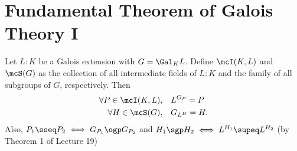 \documentclass[a4paper]{article}
\begin{document}
\section{Fundamental Theorem of Galois Theory I}
\begin{ttheorem}
  Let \( L:K \) be a Galois extension with \( G=\Gal_K L \).
  Define \( \mcI(K,L) \) and \( \mcS(G) \) as the collection of all intermediate fields of \(L:K\) and the family of all subgroups of \( G \), respectively.
  Then \begin{align*}
    \forall P\in \mcI(K,L), \quad &L^{G_P} = P \\
    \forall H\in \mcS(G), \quad &G_{L^H} = H.
  \end{align*}
  Also, \( P_1\sseq P_2 \iff G_{P_1}\ogp G_{P_2} \) and \( H_1 \sgp H_2 \iff L^{H_1}\supeq L^{H_2} \) (by Theorem 1 of Lecture 19)
\end{ttheorem}







\end{document}

